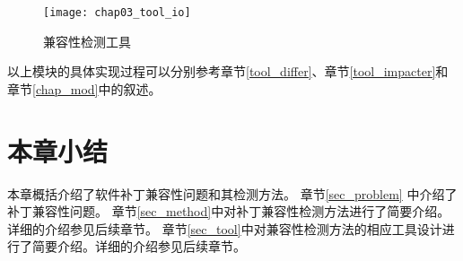 \begin{figure}[H]
	\centering
	\texttt{[image: chap03\_tool\_io]}
	\caption {兼容性检测工具}
	\label {chap03_tool_io}	
\end{figure}


以上模块的具体实现过程可以分别参考章节\ref {tool_differ}、章节\ref {tool_impacter}和章节\ref {chap_mod}中的叙述。

\section{本章小结}
本章概括介绍了软件补丁兼容性问题和其检测方法。
章节\ref {sec_problem} 中介绍了补丁兼容性问题。
章节\ref {sec_method}中对补丁兼容性检测方法进行了简要介绍。详细的介绍参见后续章节。
章节\ref {sec_tool}中对兼容性检测方法的相应工具设计进行了简要介绍。详细的介绍参见后续章节。



